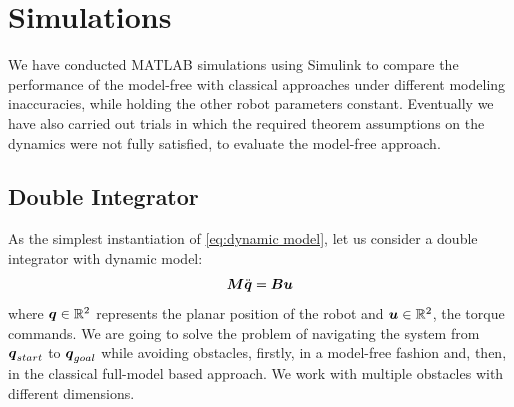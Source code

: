\section{Simulations}
We have conducted MATLAB simulations using Simulink to compare the performance of the model-free with classical approaches under different modeling inaccuracies, while holding the other robot parameters constant. Eventually we have also carried out trials in which the required theorem assumptions on the dynamics were not fully satisfied, to evaluate the model-free approach.

\subsection{Double Integrator}
As the simplest instantiation of \eqref{eq:dynamic model}, let us consider a double integrator with dynamic model: 
\begin{equation}
    \boldsymbol{M}\ddot{{\boldsymbol{q}}} = \boldsymbol{B}\boldsymbol{u}
\end{equation}
where ${\boldsymbol{q}} \in \mathbb{R}^2$ represents the planar position of the robot and $\boldsymbol{u} \in \mathbb{R}^2$, the torque commands.
We are going to solve the problem of navigating the system from ${\boldsymbol{q}}_{start}$ to ${\boldsymbol{q}}_{goal}$ while avoiding obstacles, firstly,  in a model-free fashion and, then, in the classical full-model based approach.
We work with multiple obstacles with  different dimensions.
